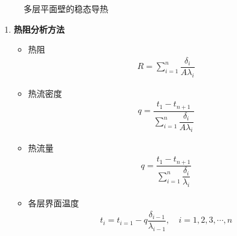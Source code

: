 \begin{figure}[!htb]
\begin{minipage}{0.3\linewidth}
		\vspace*{-3em}
		\caption{多层平面壁的稳态导热}
		\label{多平面壁}
	\end{minipage}
	\end{figure}
\vspace*{-2.5em}
	\begin{enumerate}[\textbf{解法} 2]
	\item \textbf{热阻分析方法}
	\begin{itemize}
		\item 热阻
		\begin{align}
			R = \sum_{ i =1}^n \dfrac{\delta_i }{A \lambda_i}
		\end{align}
		\vspace*{-2em}
		\item 热流密度
		\vspace*{-1em}
		\begin{align}
			q =  \dfrac{t_1 -t_{n+1}}{\displaystyle \sum_{ i =1}^n \dfrac{\delta_i }{A \lambda_i}}
		\end{align}
		\vspace*{-2em}
			\item 热流量
		\vspace*{-1em}
		\begin{align}
			q =  \dfrac{t_1 -t_{n+1}}{\displaystyle \sum_{ i =1}^n \dfrac{\delta_i }{ \lambda_i}}
		\end{align}
		\vspace*{-2em}
		\item 各层界面温度
		\vspace*{-1em}
		\begin{align}
			t_i = t_{i = 1} - q\dfrac{\delta_{i -1}}{\lambda_{i -1}}, \quad i = 1,2,3,\cdots,n
		\end{align}
		\vspace*{-2em}
	\end{itemize}
\end{enumerate}


